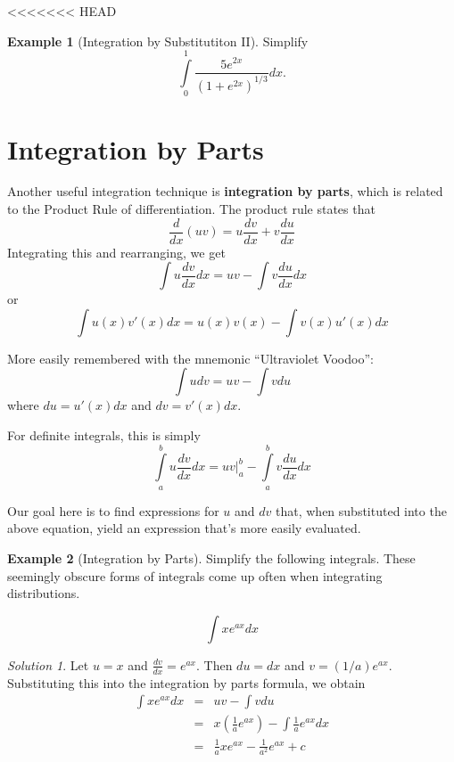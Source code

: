 \documentclass[]{book}
\theoremstyle{definition}
\theoremstyle{definition}
\newtheorem{example}{Example}[chapter]
\theoremstyle{definition}
\theoremstyle{remark}
\newtheorem*{solution}{Solution}
\begin{document}
<<<<<<< HEAD
\begin{example}[Integration by Substitutiton II]
\protect\hypertarget{exm:intsub2}{}{\label{exm:intsub2} {} }Simplify \[\int\limits_0^1 \frac{5e^{2x}}{(1+e^{2x})^{1/3}}dx.\]
\end{example}

\hypertarget{integration-by-parts}{%
\section{Integration by Parts}\label{integration-by-parts}}

Another useful integration technique is \textbf{integration by parts}, which is related to the Product Rule of differentiation. The product rule states that \[\frac{d}{dx}(uv)=u\frac{dv}{dx}+v\frac{du}{dx}\] Integrating this and rearranging, we get \[\int u\frac{dv}{dx}dx= u v - \int v \frac{du}{dx}dx\] or \[\int u(x) v'(x)dx=u(x)v(x) - \int v(x)u'(x)dx\]

More easily remembered with the mnemonic ``Ultraviolet Voodoo'': \[\int u dv = u v - \int v du\] where \(du=u'(x)dx\) and \(dv=v'(x)dx\).

For definite integrals, this is simply
\[\int\limits_a^b u\frac{dv}{dx}dx = \left. u v \right|_a^b - \int\limits_a^b v \frac{du}{dx}dx\]

Our goal here is to find expressions for \(u\) and \(dv\) that, when substituted into the above equation, yield an expression that's more easily evaluated.

\begin{example}[Integration by Parts]
\protect\hypertarget{exm:unnamed-chunk-31}{}{\label{exm:unnamed-chunk-31} {} }Simplify the following integrals. These seemingly obscure forms of integrals come up often when integrating distributions.

\[\int x e^{ax} dx\]
\end{example}

\begin{solution}
{}
Let \(u=x\) and \(\frac{dv}{dx} = e^{ax}\). Then \(du=dx\) and \(v=(1/a)e^{ax}\). Substituting this into the integration by parts formula, we obtain\\
\begin{eqnarray}
\int x e^{ax} dx &=& u v - \int v du\nonumber\\
                &=&x\left( \frac{1}{a}e^{ax}\right) -\int\frac{1}{a}e^{ax}dx\nonumber\\
                &=&\frac{1}{a}xe^{ax}-\frac{1}{a^2}e^{ax}+c\nonumber
\end{eqnarray}
\end{solution}
\end{document}
